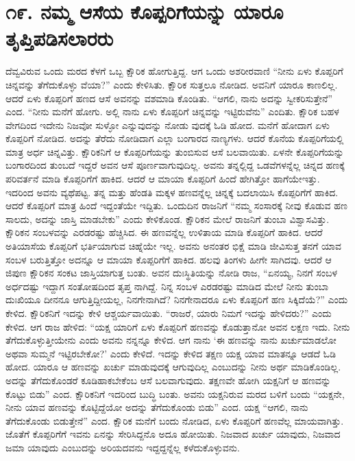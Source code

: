 \section{\num{೧೯.} ನಮ್ಮ ಆಸೆಯ ಕೊಪ್ಪರಿಗೆಯನ್ನು ಯಾರೂ ತೃಪ್ತಿಪಡಿಸಲಾರರು}

ದೆವ್ವವಿರುವ ಒಂದು ಮರದ ಕೆಳಗೆ ಒಬ್ಬ ಕ್ಷೌರಿಕ ಹೋಗುತ್ತಿದ್ದ. ಆಗ ಒಂದು ಅಶರೀರವಾಣಿ “ನೀನು ಏಳು ಕೊಪ್ಪರಿಗೆ ಚಿನ್ನವನ್ನು ತೆಗೆದುಕೊಳ್ಳು ವೆಯಾ?” ಎಂದು ಕೇಳಿಸಿತು. ಕ್ಷೌರಿಕ ಸುತ್ತಲೂ ನೋಡಿದ. ಅವನಿಗೆ ಯಾರೂ ಕಾಣಲಿಲ್ಲ. ಆದರೆ ಏಳು ಕೊಪ್ಪರಿಗೆ ಹಣದ ಆಸೆ ಅವನನ್ನು ವಶಮಾಡಿ ಕೊಂಡಿತು. “ಆಗಲಿ, ನಾನು ಅದನ್ನು ಸ್ವೀಕರಿಸುತ್ತೇನೆ” ಎಂದ. “ನೀನು ಮನೆಗೆ ಹೋಗು. ಅಲ್ಲಿ ನಾನು ಏಳು ಕೊಪ್ಪರಿಗೆ ಚಿನ್ನವನ್ನು ಇಟ್ಟಿರುವೆನು” ಎಂದಿತು. ಕ್ಷೌರಿಕ ಬಹಳ ವೇಗದಿಂದ ಇದೇನು ನಿಜವೋ ಸುಳ್ಳೋ ಎನ್ನುವುದನ್ನು ನೋಡು ವುದಕ್ಕೆ ಓಡಿ ಹೋದ. ಮನೆಗೆ ಹೋದಾಗ ಏಳು ಕೊಪ್ಪರಿಗೆ ನೋಡಿದ. ಅದನ್ನು ತೆರೆದು ನೋಡಿದಾಗ ಎಲ್ಲಾ ಬಂಗಾರದ ನಾಣ್ಯಗಳು. ಆದರೆ ಕೊನೆಯ ಕೊಪ್ಪರಿಗೆಯಲ್ಲಿ ಮಾತ್ರ ಅರ್ಧ ಚಿನ್ನವಿತ್ತು. ಕ್ಷೌರಿಕನಿಗೆ ಆ ಕೊಪ್ಪರಿಗೆಯನ್ನು ತುಂಬಿಸುವ ಆಸೆ ಬಲವಾಯಿತು. ಏಳನೇ ಕೊಪ್ಪರಿಗೆಯನ್ನು ಬಂಗಾರದಿಂದ ತುಂಬದೆ ಇದ್ದರೆ ಅವನ ಆಸೆ ಪೂರ್ಣವಾಗುವುದಿಲ್ಲ. ಅವನು ತನ್ನಲ್ಲಿದ್ದ ಒಡವೆಗಳನ್ನೆಲ್ಲ ಚಿನ್ನದ ಹಣಕ್ಕೆ ಪರಿವರ್ತನೆ ಮಾಡಿ ಕೊಪ್ಪರಿಗೆಗೆ ಹಾಕಿದ. ಆದರೆ ಆ ಮಾಯಾ ಕೊಪ್ಪರಿಗೆ ಹಿಂದೆ ಹೇಗಿತ್ತೋ ಹಾಗೆಯೇಇತ್ತು. ಇದರಿಂದ ಅವನು ವ್ಯಥೆಪಟ್ಟ. ತನ್ನ ಮತ್ತು ಹೆಂಡತಿ ಮಕ್ಕಳ ಹಣವನ್ನೆಲ್ಲ ಚಿನ್ನಕ್ಕೆ ಬದಲಾಯಿಸಿ ಕೊಪ್ಪರಿಗೆಗೆ ಹಾಕಿದ. ಆದರೆ ಕೊಪ್ಪರಿಗೆ ಮಾತ್ರ ಹಿಂದೆ ಇದ್ದಂತೆಯೇ ಇದ್ದಿತು. ಒಂದುದಿನ ರಾಜನಿಗೆ “ನಮ್ಮ ಸಂಸಾರಕ್ಕೆ ನೀವು ಕೊಡುವ ಹಣ ಸಾಲದು, ಅದನ್ನು ಜಾಸ್ತಿ ಮಾಡಬೇಕು” ಎಂದು ಕೇಳಿಕೊಂಡ. ಕ್ಷೌರಿಕನ ಮೇಲೆ ರಾಜನಿಗೆ ತುಂಬಾ ವಿಶ್ವಾಸವಿತ್ತು. ಕ್ಷೌರಿಕನ ಸಂಬಳವನ್ನು ಎರಡರಷ್ಟು ಹೆಚ್ಚಿಸಿದ. ಈ ಹಣವನ್ನೆಲ್ಲ ಉಳಿತಾಯ ಮಾಡಿ ಕೊಪ್ಪರಿಗೆ ಹಾಕಿದ. ಆದರೆ ಅತಿಯಾಸೆಯ ಕೊಪ್ಪರಿಗೆ ಭರ್ತಿಯಾಗುವ ಚಿಹ್ನೆಯೇ ಇಲ್ಲ. ಅವನು ಅನಂತರ ಭಿಕ್ಷೆ ಮಾಡಿ ಜೀವಿಸುತ್ತ ತನಗೆ ಯಾವ ಸಂಬಳ ಬರುತ್ತಿತ್ತೋ ಅದನ್ನೂ ಆ ಮಾಯಾ ಕೊಪ್ಪರಿಗೆಗೆ ಹಾಕಿದ. ಹಲವು ತಿಂಗಳು ಹೀಗೇ ಸಾಗಿದವು. ಆದರೆ ಆ ಜಿಪುಣ ಕ್ಷೌರಿಕನ ಸಂಕಟ ಜಾಸ್ತಿಯಾಗುತ್ತ ಬಂತು. ಅವನ ದುಃಸ್ಥಿತಿಯನ್ನು ನೋಡಿ ರಾಜ, “ಏನಯ್ಯ, ನಿನಗೆ ಸಂಬಳ ಅರ್ಧದಷ್ಟು ಇದ್ದಾಗ ಸಂತೋಷದಿಂದ ತೃಪ್ತ ನಾಗಿದ್ದೆ. ನಿನ್ನ ಸಂಬಳ ಎರಡರಷ್ಟು ಮಾಡಿದ ಮೇಲೆ ನೀನು ತುಂಬಾ ದುಃಖಿಯೂ ದೀನನೂ ಆಗುತ್ತಿದ್ದೀಯಲ್ಲ, ನಿನಗೇನಾಗಿದೆ? ನಿನಗೇನಾದರೂ ಏಳು ಕೊಪ್ಪರಿಗೆ ಹಣ ಸಿಕ್ಕಿದೆಯೆ?” ಎಂದು ಕೇಳಿದ. ಕ್ಷೌರಿಕನಿಗೆ ಇದನ್ನು ಕೇಳಿ ಆಶ್ಚರ್ಯವಾಯಿತು. “ರಾಜರೆ, ಯಾರು ನಿಮಗೆ ಇದನ್ನು ಹೇಳಿದರು?” ಎಂದು ಕೇಳಿದ. ಆಗ ರಾಜ ಹೇಳಿದ: “ಯಕ್ಷ ಯಾರಿಗೆ ಏಳು ಕೊಪ್ಪರಿಗೆ ಹಣವನ್ನು ಕೊಡುತ್ತಾನೋ ಅವನ ಲಕ್ಷಣ ಇದು. ನೀನು ತೆಗೆದುಕೊಳ್ಳುತ್ತೀಯೇನು ಎಂದು ಅವನು ನನ್ನನ್ನೂ ಕೇಳಿದ. ಆಗ ನಾನು ‘ಈ ಹಣವನ್ನು ನಾನು ಖರ್ಚುಮಾಡಲೋ ಅಥವಾ ಸುಮ್ಮನೆ ಇಟ್ಟಿರಬೇಕೋ?’ ಎಂದು ಕೇಳಿದೆ. ಇದನ್ನು ಕೇಳಿದ ತಕ್ಷಣ ಯಕ್ಷ ಯಾವ ಮಾತನ್ನೂ ಆಡದೆ ಓಡಿ ಹೋದ. ಯಾರೂ ಆ ಹಣವನ್ನು ಖರ್ಚು ಮಾಡುವುದಕ್ಕೆ ಆಗುವುದಿಲ್ಲ ಎಂಬುದನ್ನು ನೀನು ಅರ್ಥ ಮಾಡಿಕೊಂಡಿಲ್ಲ. ಅದನ್ನು ತೆಗೆದುಕೊಂಡರೆ ಕೂಡಿಹಾಕಬೇಕೆಂಬ ಆಸೆ ಬಲವಾಗುವುದು. ತಕ್ಷಣವೇ ಹೋಗಿ ಯಕ್ಷನಿಗೆ ಆ ಹಣವನ್ನು ಕೊಟ್ಟು ಬಿಡು” ಎಂದ. ಕ್ಷೌರಿಕನಿಗೆ ಇದರಿಂದ ಬುದ್ಧಿ ಬಂತು. ಅವನು ಯಕ್ಷನಿರುವ ಮರದ ಬಳಿಗೆ ಬಂದು “ಯಕ್ಷನೇ, ನೀನು ಯಾವ ಹಣವನ್ನು ಕೊಟ್ಟಿದ್ದೆಯೋ ಅದನ್ನು ತೆಗೆದುಕೊಂಡು ಬಿಡು” ಎಂದ. ಯಕ್ಷ “ಆಗಲಿ, ನಾನು ತೆಗೆದುಕೊಂಡು ಬಿಡುತ್ತೇನೆ” ಎಂದ. ಕ್ಷೌರಿಕ ಮನೆಗೆ ಬಂದು ನೋಡಿದ, ಏಳು ಕೊಪ್ಪರಿಗೆ ಹಣವೆಲ್ಲ ಮಾಯವಾಗಿತ್ತು. ಜೊತೆಗೆ ಕೊಪ್ಪರಿಗೆಗೆ ಇವನು ಏನನ್ನು ಸೇರಿಸಿದ್ದನೊ ಅದೂ ಹೋಯಿತು. ನಿಜವಾದ ಖರ್ಚು ಯಾವುದು, ನಿಜವಾದ ಜಮಾ ಯಾವುದು ಎಂಬುದನ್ನು ಅರಿಯದವನು ಇದ್ದದ್ದನ್ನೆಲ್ಲ ಕಳೆದುಕೊಳ್ಳುವನು.


